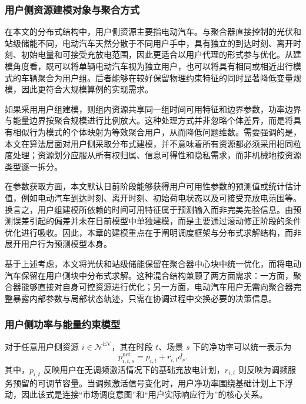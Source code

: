 \subsubsection{用户侧资源建模对象与聚合方式}
\label{subsubsec:vpp_admm_model_user_signal_resource}

在本文的分布式结构中，用户侧资源主要指电动汽车。与聚合器直接控制的光伏和站级储能不同，电动汽车天然分散于不同用户手中，具有独立的到达时刻、离开时刻、初始电量和可接受充放电范围，因此更适合以用户代理的形式参与优化。从建模角度看，既可以将单辆电动汽车视为独立用户，也可以将具有相同或相近出行模式的车辆聚合为用户组。后者能够在较好保留物理约束特征的同时显著降低变量规模，因此更符合大规模算例的实现需求。

如果采用用户组建模，则组内资源共享同一组时间可用特征和边界参数，功率边界与能量边界按聚合规模进行比例放大。这种处理方式并非忽略个体差异，而是将具有相似行为模式的个体映射为等效聚合用户，从而降低问题维数。需要强调的是，本文在算法层面对用户侧采取分布式建模，并不意味着所有资源都必须采用相同粒度处理；资源划分应服从所有权归属、信息可得性和隐私需求，而非机械地按资源类型逐一拆分。

在参数获取方面，本文默认日前阶段能够获得用户可用性参数的预测值或统计估计值，例如电动汽车到达时刻、离开时刻、初始荷电状态以及可接受充放电范围等。换言之，用户组建模所依赖的时间可用特征属于预测输入而非完美先验信息。由预测误差引起的偏差并未在日前模型中单独建模，而是主要通过滚动修正阶段的条件优化进行吸收。因此，本章的建模重点在于阐明调度框架与分布式求解结构，而非展开用户行为预测模型本身。

基于上述考虑，本文将光伏和站级储能保留在聚合器中心块中统一优化，而将电动汽车保留在用户侧块中分布式求解。这种混合结构兼顾了两方面需求：一方面，聚合器能够直接对自身可控资源进行优化；另一方面，电动汽车用户无需向聚合器完整暴露内部参数与局部状态轨迹，只需在协调过程中交换必要的决策信息。

\subsubsection{用户侧功率与能量约束模型}
\label{subsubsec:vpp_admm_model_user_signal_constraints}

对于任意用户侧资源 $i \in \mathcal{N}^{\mathrm{EV}}$，其在时段 $t$、场景 $s$ 下的净功率可以统一表示为
\begin{equation}
p_{i,t,s}^{\mathrm{net}} = p_{i,t} + r_{i,t} d_s.
\end{equation}
其中，$p_{i,t}$ 反映用户在无调频激活情况下的基础充放电计划，$r_{i,t}$ 则反映为调频服务预留的可调节容量。当调频激活信号变化时，用户净功率围绕基础计划上下浮动，因此该式是连接“市场调度意图”和“用户实际响应行为”的核心关系。

